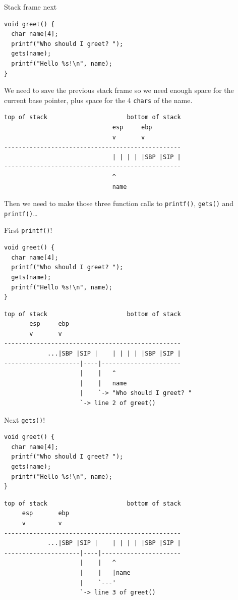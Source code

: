 \documentclass[9pt,aspectratio=169]{beamer}
\begin{document}
\begin{frame}[label={sec:orgbf84e22},fragile]{Stack frame next}
 \begin{verbatim}
void greet() {
  char name[4];
  printf("Who should I greet? ");
  gets(name);
  printf("Hello %s!\n", name);
}
\end{verbatim}

We need to save the previous stack frame so we need enough space for the current base pointer, plus space for the 4 \texttt{chars} of the name.

\begin{verbatim}
top of stack                      bottom of stack
                              esp     ebp
                              v       v
-------------------------------------------------
                              | | | | |SBP |SIP |
-------------------------------------------------
                              ^
                              name
\end{verbatim}

Then we need to make those three function calls to \texttt{printf()}, \texttt{gets()} and \texttt{printf()}\ldots{}
\end{frame}

\begin{frame}[label={sec:org56e974a},fragile]{First \texttt{printf()}!}
 \begin{verbatim}
void greet() {
  char name[4];
  printf("Who should I greet? ");
  gets(name);
  printf("Hello %s!\n", name);
}
\end{verbatim}

\begin{verbatim}
top of stack                      bottom of stack
       esp     ebp
       v       v
-------------------------------------------------
            ...|SBP |SIP |    | | | | |SBP |SIP |
---------------------|----|----------------------
                     |    |   ^
                     |    |   name
                     |    `-> "Who should I greet? "
                     `-> line 2 of greet()
\end{verbatim}
\end{frame}

\begin{frame}[label={sec:orgdd75af4},fragile]{Next \texttt{gets()}!}
 \begin{verbatim}
void greet() {
  char name[4];
  printf("Who should I greet? ");
  gets(name);
  printf("Hello %s!\n", name);
}
\end{verbatim}

\begin{verbatim}
top of stack                      bottom of stack
     esp       ebp
     v         v
-------------------------------------------------
            ...|SBP |SIP |    | | | | |SBP |SIP |
---------------------|----|----------------------
                     |    |   ^
                     |    |   |name
                     |    `---'
                     `-> line 3 of greet()
\end{verbatim}
\end{frame}
\end{document}
